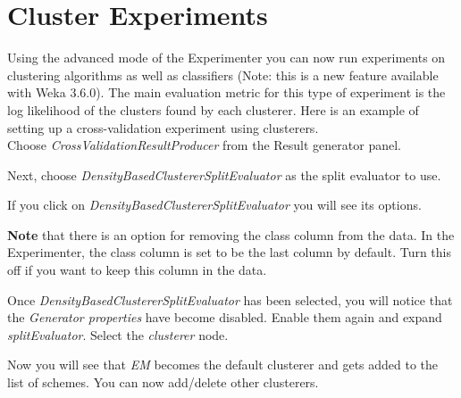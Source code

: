 \newpage
\section{Cluster Experiments}
Using the advanced mode of the Experimenter you can now run experiments on
clustering algorithms as well as classifiers (Note: this is a new feature
available with Weka 3.6.0). The main evaluation metric for this type of
experiment is the log likelihood of the clusters found by each clusterer. Here
is an example of setting up a cross-validation experiment using clusterers. \\

\noindent Choose \textit{CrossValidationResultProducer} from the Result generator panel.
\begin{center}
\end{center}

\newpage

\noindent Next, choose \textit{DensityBasedClustererSplitEvaluator} as the split evaluator
to use.
\begin{center}
\end{center}

\noindent If you click on \textit{DensityBasedClustererSplitEvaluator} you will see its
options.

\noindent \textbf{Note} that there is an option for removing the class column
from the data. In the Experimenter, the class column is set to be the last
column by default. Turn this off if you want to keep this column in the data.
\begin{center}
\end{center}

\noindent Once \textit{DensityBasedClustererSplitEvaluator} has been selected, you will
notice that the \textit{Generator properties} have become disabled. Enable them
again and expand \textit{splitEvaluator}. Select the \textit{clusterer} node.
\begin{center}
\end{center}

\noindent Now you will see that \textit{EM} becomes the default clusterer and gets added
to the list of schemes. You can now add/delete other clusterers.

